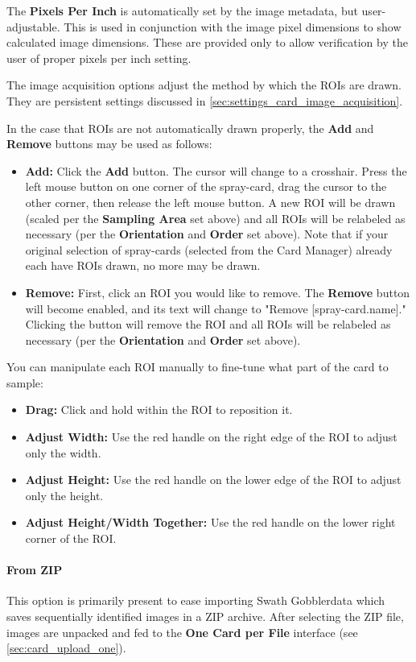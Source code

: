 \documentclass[10pt,letterpaper,titlepage]{article}
\begin{document}
    The \textbf{Pixels Per Inch} is automatically set by the image metadata, but user-adjustable. This is used in conjunction with the image pixel dimensions to show calculated image dimensions. These are provided only to allow verification by the user of proper pixels per inch setting.\par
    The image acquisition options adjust the method by which the ROIs are drawn. They are persistent settings discussed in \autoref{sec:settings_card_image_acquisition}.\par
    In the case that ROIs are not automatically drawn properly, the \textbf{Add} and \textbf{Remove} buttons may be used as follows:
    \begin{itemize} 
        \item \textbf{Add:} Click the \textbf{Add} button. The cursor will change to a crosshair. Press the left mouse button on one corner of the spray-card, drag the cursor to the other corner, then release the left mouse button. A new ROI will be drawn (scaled per the \textbf{Sampling Area} set above) and all ROIs will be relabeled as necessary (per the \textbf{Orientation} and \textbf{Order} set above). Note that if your original selection of spray-cards (selected from the Card Manager) already each have ROIs drawn, no more may be drawn.
        \item \textbf{Remove:} First, click an ROI you would like to remove. The \textbf{Remove} button will become enabled, and its text will change to "Remove [spray-card.name]." Clicking the button will remove the ROI and all ROIs will be relabeled as necessary (per the \textbf{Orientation} and \textbf{Order} set above).
    \end{itemize}
    You can manipulate each ROI manually to fine-tune what part of the card to sample:
    \begin{itemize}
        \item \textbf{Drag:} Click and hold within the ROI to reposition it.
        \item \textbf{Adjust Width:} Use the red handle on the right edge of the ROI to adjust only the width.
        \item \textbf{Adjust Height:} Use the red handle on the lower edge of the ROI to adjust only the height.
        \item \textbf{Adjust Height/Width Together:} Use the red handle on the lower right corner of the ROI.
    \end{itemize}
    
    \paragraph{From ZIP}
    This option is primarily present to ease importing Swath Gobbler\texttrademark data which saves sequentially identified images in a ZIP archive. After selecting the ZIP file, images are unpacked and fed to the \textbf{One Card per File} interface (see \autoref{sec:card_upload_one}).
\end{document}
